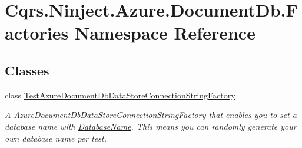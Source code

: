 \hypertarget{namespaceCqrs_1_1Ninject_1_1Azure_1_1DocumentDb_1_1Factories}{}\section{Cqrs.\+Ninject.\+Azure.\+Document\+Db.\+Factories Namespace Reference}
\label{namespaceCqrs_1_1Ninject_1_1Azure_1_1DocumentDb_1_1Factories}
\subsection*{Classes}
\begin{DoxyCompactItemize}
\item 
class \hyperlink{classCqrs_1_1Ninject_1_1Azure_1_1DocumentDb_1_1Factories_1_1TestAzureDocumentDbDataStoreConnectionStringFactory}{Test\+Azure\+Document\+Db\+Data\+Store\+Connection\+String\+Factory}
\begin{DoxyCompactList}\small\item\em A \hyperlink{classCqrs_1_1Azure_1_1DocumentDb_1_1Factories_1_1AzureDocumentDbDataStoreConnectionStringFactory_a9b08d89df792a20e71f5278dbf39b804_a9b08d89df792a20e71f5278dbf39b804}{Azure\+Document\+Db\+Data\+Store\+Connection\+String\+Factory} that enables you to set a database name with \hyperlink{classCqrs_1_1Ninject_1_1Azure_1_1DocumentDb_1_1Factories_1_1TestAzureDocumentDbDataStoreConnectionStringFactory_ae0da37bd91333ad782058d32d4de2594_ae0da37bd91333ad782058d32d4de2594}{Database\+Name}. This means you can randomly generate your own database name per test. \end{DoxyCompactList}\end{DoxyCompactItemize}
